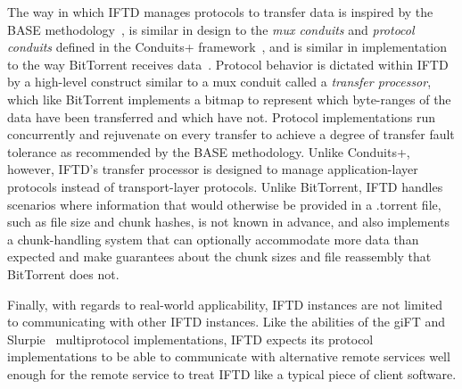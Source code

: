 The way in which IFTD manages protocols to transfer data is inspired by the BASE methodology~\cite{base_paper}, is similar in design to the \textit{mux conduits} and \textit{protocol conduits} defined in the Conduits+ framework~\cite{conduits_paper}, and is similar in implementation to the way BitTorrent receives data~\cite{BitTorrent}. Protocol behavior is dictated within IFTD by a high-level construct similar to a mux conduit called a \textit{transfer processor}, which like BitTorrent implements a bitmap to represent which byte-ranges of the data have been transferred and which have not.  Protocol implementations run concurrently and rejuvenate on every transfer to achieve a degree of transfer fault tolerance as recommended by the BASE methodology.  Unlike Conduits+, however, IFTD's transfer processor is designed to manage application-layer protocols instead of transport-layer protocols.  Unlike BitTorrent, IFTD handles scenarios where information that would otherwise be provided in a .torrent file, such as file size and chunk hashes, is not known in advance, and also implements a chunk-handling system that can optionally accommodate more data than expected and make guarantees about the chunk sizes and file reassembly that BitTorrent does not.

Finally, with regards to real-world applicability, IFTD instances are not limited to communicating with other IFTD instances.  Like the abilities of the giFT and Slurpie~\cite{slurpie_paper} multiprotocol implementations, IFTD expects its protocol implementations to be able to communicate with alternative remote services well enough for the remote service to treat IFTD like a typical piece of client software.
